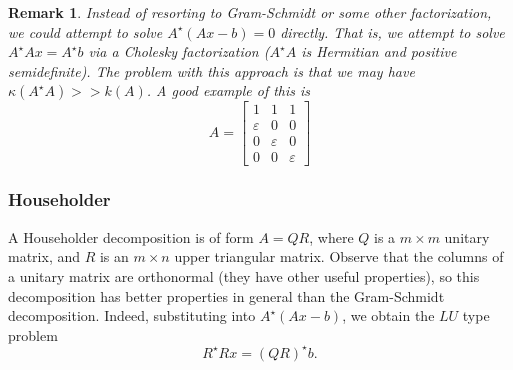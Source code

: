 \documentclass[12pt,reqno]{amsart}
\numberwithin{equation}{section}  %
\newcommand{\ee}{\varepsilon}
\newtheorem{remark}[theorem]{Remark}
\begin{document}
\begin{remark}
Instead of resorting to Gram-Schmidt or some other factorization, we could
attempt to solve $ A^{\star}(Ax - b) = 0 $ directly. That is, we attempt to
solve $ A^{\star}Ax = A^{\star}b $ via a Cholesky factorization ($ A^{\star}A$
is Hermitian and positive semidefinite). The problem with this approach is that
we may have $\kappa(A^{\star}A) >> k(A)$. A good example of this is 
\begin{equation*}
A = 
\begin{bmatrix}
 1 & 1 & 1 \\
 \ee & 0 & 0 \\
 0 & \ee & 0 \\
 0 & 0 & \ee 
\end{bmatrix}
\end{equation*}
\end{remark}
\subsubsection{Householder}
A Householder decomposition is of form $A = QR$, where $Q$ is a $m \times m$ unitary matrix, and
$R$ is an $m \times n$ upper triangular matrix. Observe that the columns of a unitary matrix
are orthonormal (they have other useful properties), so this decomposition has better properties
in general than the Gram-Schmidt decomposition. Indeed, substituting into $A^{\star}(Ax-b)$, we 
obtain the $LU$ type problem
\begin{equation*}
R^{\star}R x = (QR)^{\star} b.
\end{equation*}
\end{document}
